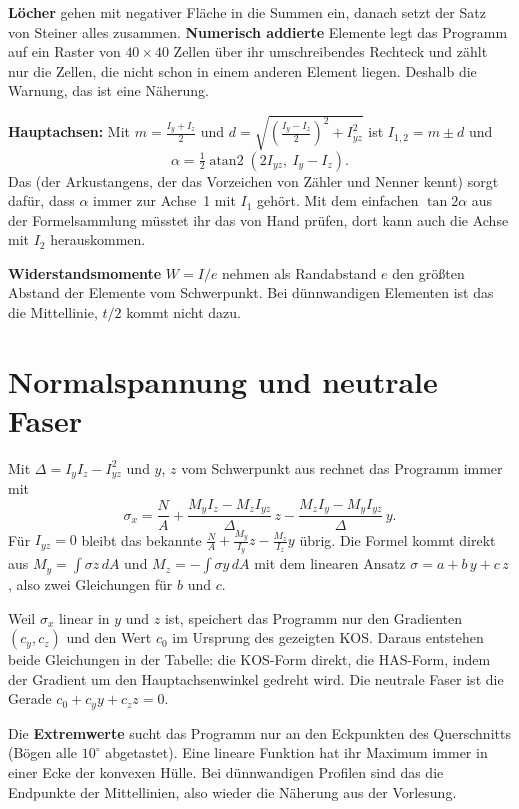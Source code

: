 \textbf{Löcher} gehen mit negativer Fläche in die Summen ein, danach setzt der Satz von Steiner alles
zusammen. \textbf{Numerisch addierte} Elemente legt das Programm auf ein Raster von $40 \times 40$
Zellen über ihr umschreibendes Rechteck und zählt nur die Zellen, die nicht schon in einem anderen
Element liegen. Deshalb die Warnung, das ist eine Näherung.

\textbf{Hauptachsen:} Mit $m = \frac{I_y + I_z}2$ und
$d = \sqrt{\left(\frac{I_y - I_z}2\right)^2 + I_{yz}^2}$ ist $I_{1,2} = m \pm d$ und
\[
  \alpha = \tfrac12 \operatorname{atan2}(2 I_{yz},\ I_y - I_z) .
\]
Das  (der Arkustangens, der das Vorzeichen von Zähler und Nenner kennt) sorgt dafür,
dass $\alpha$ immer zur Achse~1 mit $I_1$ gehört. Mit dem einfachen $\tan 2\alpha$ aus der
Formelsammlung müsstet ihr das von Hand prüfen, dort kann auch die Achse mit $I_2$ herauskommen.

\textbf{Widerstandsmomente} $W = I/e$ nehmen als Randabstand $e$ den größten Abstand der Elemente
vom Schwerpunkt. Bei dünnwandigen Elementen ist das die Mittellinie, $t/2$ kommt nicht dazu.

\section{Normalspannung und neutrale Faser}\label{sec:mathe-sigma}

Mit $\Delta = I_y I_z - I_{yz}^2$ und $y$, $z$ vom Schwerpunkt aus rechnet das Programm immer mit
\[
  \sigma_x = \frac NA + \frac{M_y I_z - M_z I_{yz}}{\Delta}\,z
                      - \frac{M_z I_y - M_y I_{yz}}{\Delta}\,y .
\]
Für $I_{yz} = 0$ bleibt das bekannte $\frac NA + \frac{M_y}{I_y} z - \frac{M_z}{I_z} y$ übrig. Die
Formel kommt direkt aus $M_y = \int \sigma z\,dA$ und $M_z = -\int \sigma y\,dA$ mit dem
linearen Ansatz $\sigma = a + b\,y + c\,z$, also zwei Gleichungen für $b$ und $c$.

Weil $\sigma_x$ linear in $y$ und $z$ ist, speichert das Programm nur den Gradienten $(c_y, c_z)$ und
den Wert $c_0$ im Ursprung des gezeigten KOS. Daraus entstehen beide Gleichungen in der Tabelle: die
KOS-Form direkt, die HAS-Form, indem der Gradient um den Hauptachsenwinkel gedreht wird. Die
neutrale Faser ist die Gerade $c_0 + c_y y + c_z z = 0$.

Die \textbf{Extremwerte} sucht das Programm nur an den Eckpunkten des Querschnitts (Bögen alle
$10^\circ$ abgetastet). Eine lineare Funktion hat ihr Maximum immer in einer Ecke der konvexen
Hülle. Bei dünnwandigen Profilen sind das die Endpunkte der Mittellinien, also wieder die
Näherung aus der Vorlesung.

